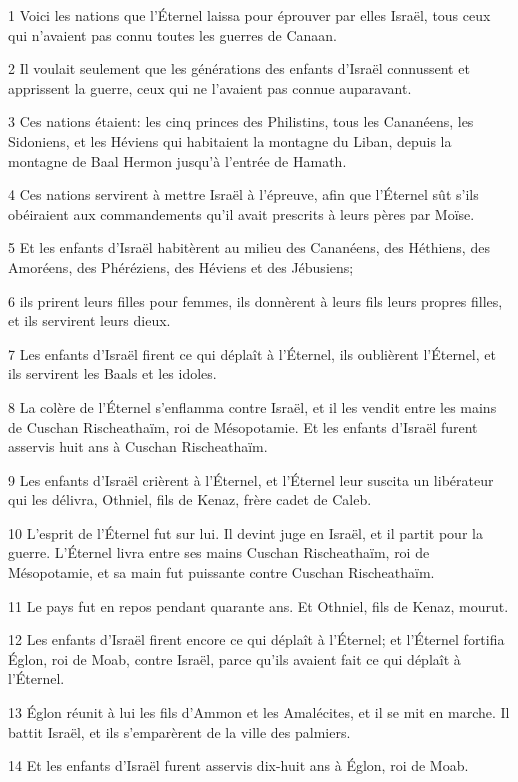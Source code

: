 \par 1 Voici les nations que l'Éternel laissa pour éprouver par elles Israël, tous ceux qui n'avaient pas connu toutes les guerres de Canaan.
\par 2 Il voulait seulement que les générations des enfants d'Israël connussent et apprissent la guerre, ceux qui ne l'avaient pas connue auparavant.
\par 3 Ces nations étaient: les cinq princes des Philistins, tous les Cananéens, les Sidoniens, et les Héviens qui habitaient la montagne du Liban, depuis la montagne de Baal Hermon jusqu'à l'entrée de Hamath.
\par 4 Ces nations servirent à mettre Israël à l'épreuve, afin que l'Éternel sût s'ils obéiraient aux commandements qu'il avait prescrits à leurs pères par Moïse.
\par 5 Et les enfants d'Israël habitèrent au milieu des Cananéens, des Héthiens, des Amoréens, des Phéréziens, des Héviens et des Jébusiens;
\par 6 ils prirent leurs filles pour femmes, ils donnèrent à leurs fils leurs propres filles, et ils servirent leurs dieux.
\par 7 Les enfants d'Israël firent ce qui déplaît à l'Éternel, ils oublièrent l'Éternel, et ils servirent les Baals et les idoles.
\par 8 La colère de l'Éternel s'enflamma contre Israël, et il les vendit entre les mains de Cuschan Rischeathaïm, roi de Mésopotamie. Et les enfants d'Israël furent asservis huit ans à Cuschan Rischeathaïm.
\par 9 Les enfants d'Israël crièrent à l'Éternel, et l'Éternel leur suscita un libérateur qui les délivra, Othniel, fils de Kenaz, frère cadet de Caleb.
\par 10 L'esprit de l'Éternel fut sur lui. Il devint juge en Israël, et il partit pour la guerre. L'Éternel livra entre ses mains Cuschan Rischeathaïm, roi de Mésopotamie, et sa main fut puissante contre Cuschan Rischeathaïm.
\par 11 Le pays fut en repos pendant quarante ans. Et Othniel, fils de Kenaz, mourut.
\par 12 Les enfants d'Israël firent encore ce qui déplaît à l'Éternel; et l'Éternel fortifia Églon, roi de Moab, contre Israël, parce qu'ils avaient fait ce qui déplaît à l'Éternel.
\par 13 Églon réunit à lui les fils d'Ammon et les Amalécites, et il se mit en marche. Il battit Israël, et ils s'emparèrent de la ville des palmiers.
\par 14 Et les enfants d'Israël furent asservis dix-huit ans à Églon, roi de Moab.
